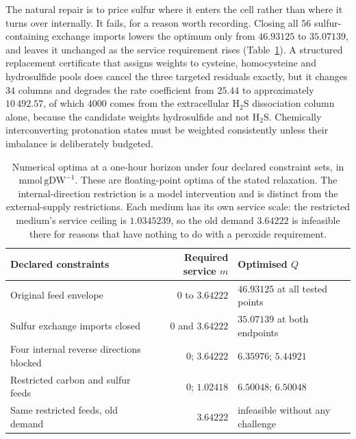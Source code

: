 \documentclass[11pt,a4paper]{article}
\theoremstyle{plain}
\theoremstyle{definition}
\theoremstyle{remark}
\newcommand{\mmolg}{\mathrm{mmol}\,\mathrm{gDW}^{-1}}
\begin{document}
The natural repair is to price sulfur where it enters the cell rather than
where it turns over internally. It fails, for a reason worth recording.
Closing all $56$ sulfur-containing exchange imports lowers the optimum only
from $46.93125$ to $35.07139$, and leaves it unchanged as the service
requirement rises (Table~\ref{tab:media}). A structured replacement certificate
that assigns weights to cysteine, homocysteine and hydrosulfide pools does
cancel the three targeted residuals exactly, but it changes $34$ columns and
degrades the rate coefficient from $25.44$ to approximately $10\,492.57$, of
which $4000$ comes from the extracellular $\mathrm H_2\mathrm S$ dissociation
column alone, because the candidate weights hydrosulfide and not
$\mathrm H_2\mathrm S$. Chemically interconverting protonation states must be
weighted consistently unless their imbalance is deliberately budgeted.

\begin{table}[t]
\centering
\small
\begin{tabular}{@{}lrl@{}}
\toprule
Declared constraints & Required service $m$ & Optimised $Q$ \\
\midrule
Original feed envelope & $0$ to $3.64222$ & $46.93125$ at all tested points \\
Sulfur exchange imports closed & $0$ and $3.64222$ & $35.07139$ at both endpoints \\
Four internal reverse directions blocked & $0$; $3.64222$ & $6.35976$; $5.44921$ \\
Restricted carbon and sulfur feeds & $0$; $1.02418$ & $6.50048$; $6.50048$ \\
Same restricted feeds, old demand & $3.64222$ & infeasible without any challenge \\
\bottomrule
\end{tabular}
\caption{Numerical optima at a one-hour horizon under four declared constraint
sets, in $\mmolg$. These are floating-point optima of the stated relaxation.
The internal-direction restriction is a model intervention and is distinct from
the external-supply restrictions. Each medium has its own service scale: the
restricted medium's service ceiling is $1.0345239$, so the old demand
$3.64222$ is infeasible there for reasons that have nothing to do with a
peroxide requirement.}
\label{tab:media}
\end{table}
\end{document}
